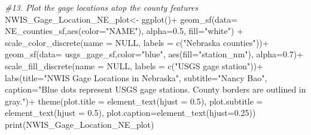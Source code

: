 \documentclass[
]{article}
\newenvironment{Shaded}{\begin{snugshade}}{\end{snugshade}}
\newcommand{\AttributeTok}[1]{\textcolor[rgb]{0.77,0.63,0.00}{#1}}
\newcommand{\CommentTok}[1]{\textcolor[rgb]{0.56,0.35,0.01}{\textit{#1}}}
\newcommand{\ConstantTok}[1]{\textcolor[rgb]{0.00,0.00,0.00}{#1}}
\newcommand{\FloatTok}[1]{\textcolor[rgb]{0.00,0.00,0.81}{#1}}
\newcommand{\FunctionTok}[1]{\textcolor[rgb]{0.00,0.00,0.00}{#1}}
\newcommand{\NormalTok}[1]{#1}
\newcommand{\OtherTok}[1]{\textcolor[rgb]{0.56,0.35,0.01}{#1}}
\newcommand{\SpecialCharTok}[1]{\textcolor[rgb]{0.00,0.00,0.00}{#1}}
\newcommand{\StringTok}[1]{\textcolor[rgb]{0.31,0.60,0.02}{#1}}
\begin{document}
\begin{Shaded}
\begin{Highlighting}[]
\CommentTok{\#13. Plot the gage locations atop the county features}
\NormalTok{NWIS\_Gage\_Location\_NE\_plot}\OtherTok{\textless{}{-}} \FunctionTok{ggplot}\NormalTok{()}\SpecialCharTok{+}
                              \FunctionTok{geom\_sf}\NormalTok{(}\AttributeTok{data=}\NormalTok{ NE\_counties\_sf,}\FunctionTok{aes}\NormalTok{(}\AttributeTok{color=}\StringTok{"NAME"}\NormalTok{),}
                                      \AttributeTok{alpha=}\FloatTok{0.5}\NormalTok{, }\AttributeTok{fill=}\StringTok{"white"}\NormalTok{) }\SpecialCharTok{+} 
                              \FunctionTok{scale\_color\_discrete}\NormalTok{(}\AttributeTok{name =} \ConstantTok{NULL}\NormalTok{, }
                                    \AttributeTok{labels =} \FunctionTok{c}\NormalTok{(}\StringTok{"Nebraska counties"}\NormalTok{))}\SpecialCharTok{+}
                              \FunctionTok{geom\_sf}\NormalTok{(}\AttributeTok{data=}\NormalTok{ usgs\_gage\_sf,}\AttributeTok{color=}\StringTok{"blue"}\NormalTok{,}
                                     \FunctionTok{aes}\NormalTok{(}\AttributeTok{fill=}\StringTok{"station\_nm"}\NormalTok{), }\AttributeTok{alpha=}\FloatTok{0.7}\NormalTok{)}\SpecialCharTok{+}
                              \FunctionTok{scale\_fill\_discrete}\NormalTok{(}\AttributeTok{name =} \ConstantTok{NULL}\NormalTok{, }\AttributeTok{labels =} \FunctionTok{c}\NormalTok{(}\StringTok{"USGS gage station"}\NormalTok{))}\SpecialCharTok{+}
                              \FunctionTok{labs}\NormalTok{(}\AttributeTok{title=}\StringTok{"NWIS Gage Locations in Nebraska"}\NormalTok{,}
                                   \AttributeTok{subtitle=}\StringTok{"Nancy Bao"}\NormalTok{,}
                              \AttributeTok{caption=}\StringTok{"Blue dots represent USGS gage stations. County borders are outlined in gray."}\NormalTok{)}\SpecialCharTok{+}
                              \FunctionTok{theme}\NormalTok{(}\AttributeTok{plot.title =} \FunctionTok{element\_text}\NormalTok{(}\AttributeTok{hjust =} \FloatTok{0.5}\NormalTok{),}
                              \AttributeTok{plot.subtitle =} \FunctionTok{element\_text}\NormalTok{(}\AttributeTok{hjust =} \FloatTok{0.5}\NormalTok{),}
                              \AttributeTok{plot.caption=}\FunctionTok{element\_text}\NormalTok{(}\AttributeTok{hjust=}\FloatTok{0.25}\NormalTok{))}
\FunctionTok{print}\NormalTok{(NWIS\_Gage\_Location\_NE\_plot)}
\end{Highlighting}
\end{Shaded}
\end{document}

